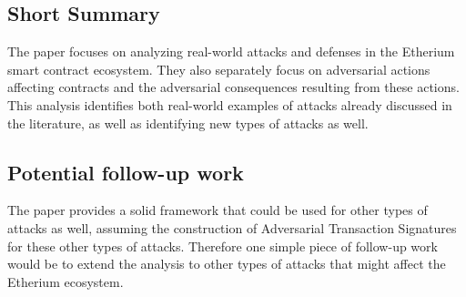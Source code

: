 \documentclass[11pt]{article}
\begin{document}
\subsection*{Short Summary}

The paper focuses on analyzing real-world attacks and defenses in the Etherium smart contract ecosystem.
They also separately focus on adversarial actions affecting contracts and the adversarial consequences resulting from these actions.
This analysis identifies both real-world examples of attacks already discussed in the literature, as well as identifying new types of attacks as well.

\subsection*{Potential follow-up work}

The paper provides a solid framework that could be used for other types of attacks as well, assuming the construction of Adversarial Transaction Signatures for these other types of attacks.
Therefore one simple piece of follow-up work would be to extend the analysis to other types of attacks that might affect the Etherium ecosystem.
\end{document}
